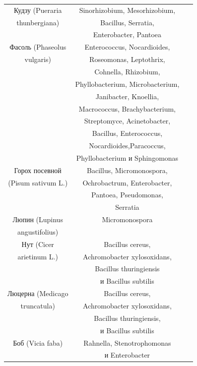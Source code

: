 \documentclass[11pt]{article}
\begin{document}
\begin{longtable}[t] { |c|c|c| }
Кудзу (Pueraria & Sinorhizobium, Mesorhizobium,  & ~\cite{s00284-007-9062-z}\\
thunbergiana) &  Bacillus, Serratia, & \\
& Enterobacter, Pantoea & \\
\hline

Фасоль (Phaseolus & Enterococcus, Nocardioides, & ~\cite{j.syapm.2010.07.005} \\
vulgaris) & Roseomonas, Leptothrix, & \\
& Cohnella, Rhizobium, & \\
& Phyllobacterium, Microbacterium, & \\
& Janibacter, Knoellia, & \\
& Macrococcus, Brachybacterium, & \\
& Streptomyce, Acinetobacter, & \\ 
& Bacillus, Enterococcus, & \\ 
& Nocardioides,Paracoccus, & \\ 
& Phyllobacterium и Sphingomonas & \\
\hline

Горох посевной & Bacillus, Micromonospora,& ~\cite{AJB11.3438, w00-098, ran_2015_1_4, j.syapm.2011.11.003, j.syapm.2016.04.003} \\
(Pisum sativum L.)&  Ochrobactrum, Enterobacter,& \\
& Pantoea, Pseudomonas, & \\
& Serratia & \\
\hline

Люпин (Lupinus & Micromonospora & ~\cite{j.syapm.2016.04.003} \\
angustifolius) & & \\
\hline

Нут (Cicer & Bacillus cereus, & ~\cite{17429145.2017.1294212}\\
arietinum L.)& Achromobacter xylosoxidans, & \\
& Bacillus thuringiensis & \\
&и Bacillus subtilis & \\
\hline

Люцерна (Medicago & Bacillus cereus, & ~\cite{MPMI-18-0169} \\
truncatula) & Achromobacter xylosoxidans, & \\ 
& Bacillus thuringiensis, & \\
& и Bacillus subtilis & \\
\hline

Боб (Vicia faba) & Rahnella, Stenotrophomonas & ~\cite{MPMI-18-0169} \\
& и Enterobacter & \\
\hline

\end{longtable}
\end{document}
